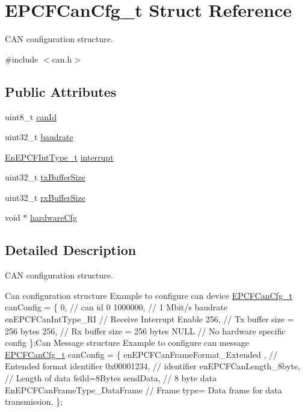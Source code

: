 \hypertarget{structEPCFCanCfg__t}{}\section{E\+P\+C\+F\+Can\+Cfg\+\_\+t Struct Reference}
\label{structEPCFCanCfg__t}


C\+AN configuration structure.  




{\ttfamily \#include $<$can.\+h$>$}

\subsection*{Public Attributes}
\begin{DoxyCompactItemize}
\item 
uint8\+\_\+t \mbox{\hyperlink{structEPCFCanCfg__t_a66231ee69af11845a8bb8f37488c39c7}{can\+Id}}
\item 
uint32\+\_\+t \mbox{\hyperlink{structEPCFCanCfg__t_a46a8db33ee1fcee6d9648a406fa6dfe2}{baudrate}}
\item 
\mbox{\hyperlink{can_8h_a62829201a68b21def737cc94b7e20803}{En\+E\+P\+C\+F\+Int\+Type\+\_\+t}} \mbox{\hyperlink{structEPCFCanCfg__t_a4127f7b6a5c2955945c76439a4a1cf46}{interrupt}}
\item 
uint32\+\_\+t \mbox{\hyperlink{structEPCFCanCfg__t_a51b05993d7024d2f9509d08107f43823}{tx\+Buffer\+Size}}
\item 
uint32\+\_\+t \mbox{\hyperlink{structEPCFCanCfg__t_aec4941edd2881599b4e1ecf5931cac29}{rx\+Buffer\+Size}}
\item 
void $\ast$ \mbox{\hyperlink{structEPCFCanCfg__t_af8295786602b4ea0f5872bbc21912dee}{hardware\+Cfg}}
\end{DoxyCompactItemize}


\subsection{Detailed Description}
C\+AN configuration structure. 

Can configuration structure Example to configure can device \mbox{\hyperlink{structEPCFCanCfg__t}{E\+P\+C\+F\+Can\+Cfg\+\_\+t}} can\+Config = \{ 0, // can id 0 1000000, // 1 Mbit/s baudrate en\+E\+P\+C\+F\+Can\+Int\+Type\+\_\+\+RI // Receive Interrupt Enable 256, // Tx buffer size = 256 bytes 256, // Rx buffer size = 256 bytes N\+U\+LL // No hardware specific config \};Can Message structure Example to configure can message \mbox{\hyperlink{structEPCFCanCfg__t}{E\+P\+C\+F\+Can\+Cfg\+\_\+t}} can\+Config = \{ en\+E\+P\+C\+F\+Can\+Frame\+Format\+\_\+\+Extended , // Entended format identifier 0x00001234, // identifier en\+E\+P\+C\+F\+Can\+Length\+\_\+8byte, // Length of data feild=8\+Bytes send\+Data, // 8 byte data En\+E\+P\+C\+F\+Can\+Frame\+Type\+\_\+\+Data\+Frame // Frame type= Data frame for data transmission. \}; 

